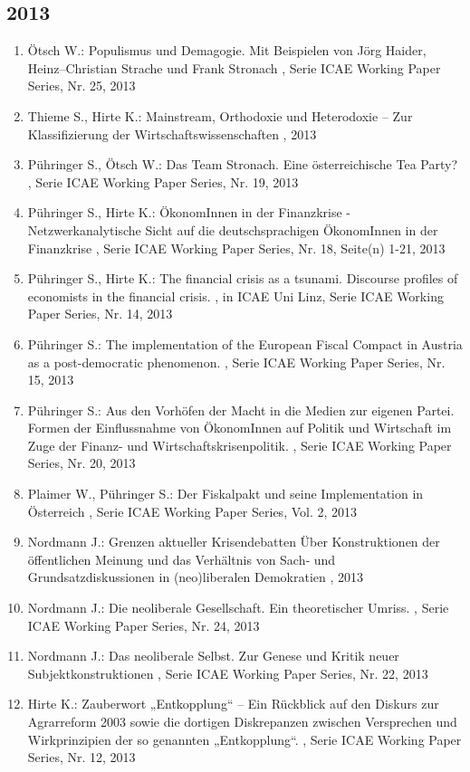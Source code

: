  \subsection*{2013} 
 \begin{enumerate}[leftmargin=*, labelsep=0.5cm] 
	 \item Ötsch W.:  Populismus und Demagogie. Mit Beispielen von Jörg Haider, Heinz–Christian Strache und Frank Stronach  , Serie ICAE Working Paper Series, Nr. 25, 2013
	 \item Thieme S., Hirte K.:  Mainstream, Orthodoxie und Heterodoxie – Zur Klassifizierung der Wirtschaftswissenschaften  , 2013
	 \item Pühringer S., Ötsch W.:  Das Team Stronach. Eine österreichische Tea Party?  , Serie ICAE Working Paper Series, Nr. 19, 2013
	 \item Pühringer S., Hirte K.:  ÖkonomInnen in der Finanzkrise - Netzwerkanalytische Sicht auf die deutschsprachigen ÖkonomInnen in der Finanzkrise  , Serie ICAE Working Paper Series, Nr. 18, Seite(n) 1-21, 2013
	 \item Pühringer S., Hirte K.:  The financial crisis as a tsunami. Discourse profiles of economists in the financial crisis.  , in ICAE Uni Linz, Serie ICAE Working Paper Series, Nr. 14, 2013
	 \item Pühringer S.:  The implementation of the European Fiscal Compact in Austria as a post-democratic phenomenon.  , Serie ICAE Working Paper Series, Nr. 15, 2013
	 \item Pühringer S.:  Aus den Vorhöfen der Macht in die Medien zur eigenen Partei. Formen der Einflussnahme von ÖkonomInnen auf Politik und Wirtschaft im Zuge der Finanz-­ und Wirtschaftskrisenpolitik.  , Serie ICAE Working Paper Series, Nr. 20, 2013
	 \item Plaimer W., Pühringer S.:  Der Fiskalpakt und seine Implementation in Österreich  , Serie ICAE Working Paper Series, Vol. 2, 2013
	 \item Nordmann J.:  Grenzen aktueller Krisendebatten Über Konstruktionen der öffentlichen Meinung und das Verhältnis von Sach‐ und Grundsatzdiskussionen in (neo)liberalen Demokratien  , 2013
	 \item Nordmann J.:  Die neoliberale Gesellschaft. Ein theoretischer Umriss.  , Serie ICAE Working Paper Series, Nr. 24, 2013
	 \item Nordmann J.:  Das neoliberale Selbst. Zur Genese und Kritik neuer Subjektkonstruktionen  , Serie ICAE Working Paper Series, Nr. 22, 2013
	 \item Hirte K.:  Zauberwort „Entkopplung“ – Ein Rückblick auf den Diskurs zur Agrarreform 2003 sowie die dortigen Diskrepanzen zwischen Versprechen und Wirkprinzipien der so genannten „Entkopplung“.  , Serie ICAE Working Paper Series, Nr. 12, 2013

\end{enumerate}
